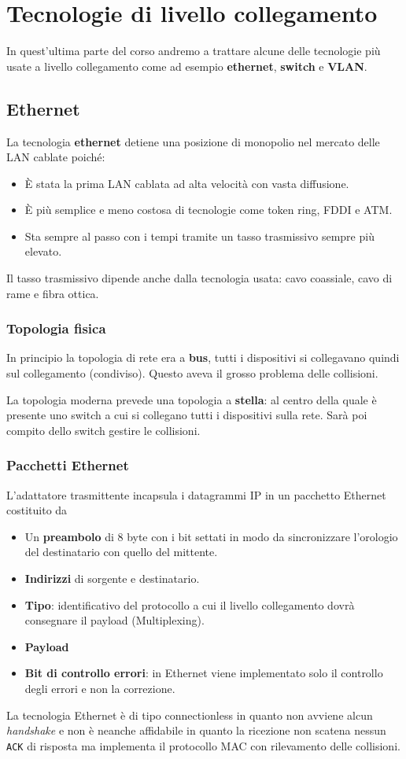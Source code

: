\section{Tecnologie di livello collegamento}
In quest'ultima parte del corso andremo a trattare alcune delle
tecnologie più usate a livello collegamento come ad esempio
\textbf{ethernet}, \textbf{switch} e \textbf{VLAN}.

\subsection{Ethernet}
La tecnologia \textbf{ethernet} detiene una posizione di monopolio
nel mercato delle LAN cablate poiché:
\begin{itemize}
	\item \`E stata la prima LAN cablata ad alta velocità con vasta
		diffusione.
	\item \`E più semplice e meno costosa di tecnologie come token
		ring, FDDI e ATM.
	\item Sta sempre al passo con i tempi tramite un tasso trasmissivo
		sempre più elevato.
\end{itemize}
Il tasso trasmissivo dipende anche dalla tecnologia usata: cavo
coassiale, cavo di rame e fibra ottica.

\subsubsection{Topologia fisica}
In principio la topologia di rete era a \textbf{bus}, tutti i 
dispositivi si collegavano quindi sul collegamento (condiviso). Questo
aveva il grosso problema delle collisioni.

La topologia moderna prevede una topologia a \textbf{stella}: al 
centro della quale è presente uno switch a cui si collegano tutti
i dispositivi sulla rete. Sarà poi compito dello switch gestire le
collisioni.

\subsubsection{Pacchetti Ethernet}
L'adattatore trasmittente incapsula i datagrammi IP in un pacchetto
Ethernet costituito da
\begin{itemize}
	\item Un \textbf{preambolo} di 8 byte con i bit settati in modo da
		sincronizzare l'orologio del destinatario con quello del
		mittente.
	\item \textbf{Indirizzi} di sorgente e destinatario.
	\item \textbf{Tipo}: identificativo del protocollo a cui il livello
		collegamento dovrà consegnare il payload (Multiplexing).
	\item \textbf{Payload}
	\item \textbf{Bit di controllo errori}: in Ethernet viene
		implementato solo il controllo degli errori e non la
		correzione.
\end{itemize}
La tecnologia Ethernet è di tipo connectionless in quanto non avviene
alcun \emph{handshake} e non è neanche affidabile in quanto la 
ricezione non scatena nessun \verb|ACK| di risposta ma implementa il 
protocollo MAC con rilevamento delle collisioni.

